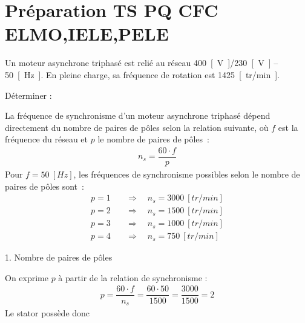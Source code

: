 \documentclass[a4paper,12pt,answers,addpoints]{exam}
\begin{document}
	\unframedsolutions
	\pointsinmargin
	\bracketedpoints
	
\section*{Préparation TS PQ CFC ELMO,IELE,PELE}
\begin{questions}
\question
Un moteur asynchrone triphasé est relié au réseau \qty{400}{[V]}/\qty{230}{[V]} – \qty{50}{[Hz]}. En pleine charge, sa fréquence de rotation est \qty{1425}{[tr/min]}.

Déterminer :


\begin{solution}

La fréquence de synchronisme d'un moteur asynchrone triphasé dépend directement du nombre de paires de pôles selon la relation suivante, où $f$ est la fréquence du réseau et $p$ le nombre de paires de pôles~:
\begin{align*}
    n_s = \dfrac{60 \cdot f}{p}
\end{align*}
Pour $f = \qty{50}{[Hz]}$, les fréquences de synchronisme possibles selon le nombre de paires de pôles sont~:
\begin{align*}
    p = 1 \quad &\Rightarrow \quad n_s = \qty{3000}{[tr/min]} \\[6pt]
    p = 2 \quad &\Rightarrow \quad n_s = \qty{1500}{[tr/min]} \\[6pt]
    p = 3 \quad &\Rightarrow \quad n_s = \qty{1000}{[tr/min]} \\[6pt]
    p = 4 \quad &\Rightarrow \quad n_s = \qty{750}{[tr/min]}
\end{align*}

1. Nombre de paires de pôles

On exprime $p$ à partir de la relation de synchronisme :
\begin{align*}
    p = \dfrac{60 \cdot f}{n_s} = \dfrac{60 \cdot 50}{1500} = \dfrac{3000}{1500} = 2
\end{align*}
Le stator possède donc 


\end{solution}
\end{questions}
\end{document}
